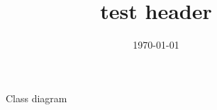 \documentclass{article}
\title{test header}
\author{}
\date{\today}
\begin{document}
\begin{figure}
\centering
\begingroup

% 




\caption{Class diagram}
\endgroup
\end{figure}
\end{document}
